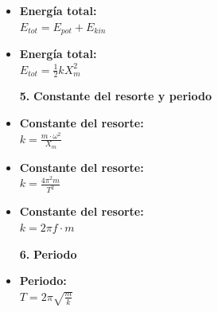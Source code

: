 \documentclass[a4paper,12pt,numbers=noenddot]{scrreprt}
\begin{document}
\begin{multicols}{2}
\begin{itemize}
    \item \textbf{Energía total:}\\ $E_{tot} = E_{pot} + E_{kin}$
    \item \textbf{Energía total:}\\ $E_{tot} = \frac{1}{2} k X_m^2$
    \item[\textbf{5.}] \textbf{\large Constante del resorte y periodo}
    \item \textbf{Constante del resorte:}\\ $k = \frac{m \cdot \omega^2}{X_m}$
    \item \textbf{Constante del resorte:}\\ $k = \frac{4\pi^2 m}{T^2}$
    \item \textbf{Constante del resorte:}\\ $k = 2\pi f \cdot m$
    \item[\textbf{6.}] \textbf{\large Periodo}
    \item \textbf{Periodo:}\\ $T = 2\pi \sqrt{\frac{m}{k}}$
\end{itemize}
\end {multicols}
\end{document}
